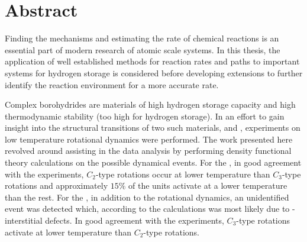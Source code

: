 \section*{Abstract}

Finding the mechanisms and estimating the rate of chemical reactions is an essential part of modern research of atomic scale systems.
In this thesis, the application of well established methods for reaction rates and paths to important systems for hydrogen storage is considered before developing extensions to further identify the reaction environment for a more accurate rate.

Complex borohydrides are materials of high hydrogen storage capacity and high thermodynamic stability (too high for hydrogen storage).
In an effort to gain insight into the structural transitions of two such materials,  and , experiments on low temperature rotational dynamics were performed.
The work presented here revolved around assisting in the data analysis by performing density functional theory calculations on the possible dynamical events.
For the , in good agreement with the experiments, $C_2$-type rotations occur at lower temperature than $C_3$-type rotations and approximately $15\%$ of the  units activate at a lower temperature than the rest.
For the , in addition to the rotational dynamics, an unidentified event was detected which, according to the calculations was most likely due to -interstitial defects.
In good agreement with the experiments, $C_3$-type rotations activate at lower temperature than $C_2$-type rotations.

